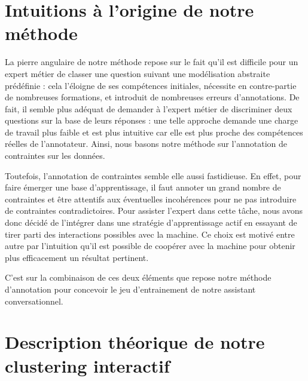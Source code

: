     \minitoc


    \section{Intuitions à l'origine de notre méthode}

		La pierre angulaire de notre méthode repose sur le fait qu'il est difficile pour un expert métier de classer une question suivant une modélisation abstraite prédéfinie :
		cela l'éloigne de ses compétences initiales, nécessite en contre-partie de nombreuses formations, et introduit de nombreuses erreurs d'annotations.
		De fait, il semble plus adéquat de demander à l'expert métier de discriminer deux questions sur la base de leurs réponses :
		une telle approche demande une charge de travail plus faible et est plus intuitive car elle est plus proche des compétences réelles de l'annotateur.
		Ainsi, nous basons notre méthode sur l'annotation de contraintes sur les données.
		
		Toutefois, l'annotation de contraintes semble elle aussi fastidieuse.
		En effet, pour faire émerger une base d'apprentissage, il faut annoter un grand nombre de contraintes et être attentifs aux éventuelles incohérences pour ne pas introduire de contraintes contradictoires.
		Pour assister l'expert dans cette tâche, nous avons donc décidé de l'intégrer dans une stratégie d'apprentissage actif en essayant de tirer parti des interactions possibles avec la machine. Ce choix est motivé entre autre par l'intuition qu'il est possible de coopérer avec la machine pour obtenir plus efficacement un résultat pertinent.

		C'est sur la combinaison de ces deux éléments que repose notre méthode d'annotation pour concevoir le jeu d'entrainement de notre assistant conversationnel.


    \section{Description théorique de notre clustering interactif}
    
